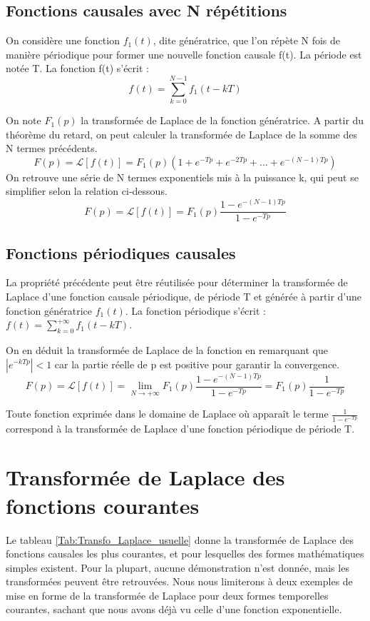 	\subsection{Fonctions causales avec N répétitions}
	On considère une fonction $f_{1}(t)$, dite génératrice, que l'on répète N fois de manière périodique pour former une nouvelle fonction causale f(t). La période est notée T. La fonction f(t) s'écrit :
	\begin{equation*}
	f(t)=\sum_{k=0}^{N-1}f_{1}(t-kT)
	\end{equation*}
	
	On note $F_{1}(p)$ la transformée de Laplace de la fonction génératrice. A partir du théorème du retard, on peut calculer la transformée de Laplace de la somme des N termes précédents.
	\begin{equation*}
	F(p)=\mathcal{L}[f(t)]=F_{1}(p)(1+e^{-Tp}+e^{-2Tp}+...+e^{-(N-1)Tp})
	\end{equation*}
	On retrouve une série de N termes exponentiels mis à la puissance k, qui peut se simplifier selon la relation ci-dessous. 
	\begin{equation}
	F(p)=\mathcal{L}[f(t)]=F_{1}(p)\frac{1-e^{-(N-1)Tp}}{1-e^{-Tp}}
	\end{equation}
	
	
	\subsection{Fonctions périodiques causales}
	La propriété précédente peut être réutilisée pour déterminer la transformée de Laplace d'une fonction causale périodique, de période T et générée à partir d'une fonction génératrice $f_{1}(t)$. La fonction périodique s'écrit : $f(t)=\sum_{k=0}^{+\infty}f_{1}(t-kT)$.
	
	On en déduit la transformée de Laplace de la fonction en remarquant que $|e^{-kTp}| < 1$ car la partie réelle de p est positive pour garantir la convergence.
	\begin{equation}
	F(p)=\mathcal{L}[f(t)]=\lim_{N \to +\infty}F_{1}(p)\frac{1-e^{-(N-1)Tp}}{1-e^{-Tp}}=F_{1}(p)\frac{1}{1-e^{-Tp}}
	\end{equation}
	
	Toute fonction exprimée dans le domaine de Laplace où apparaît le terme $\frac{1}{1-e^{-Tp}}$ correspond à la transformée de Laplace d'une fonction périodique de période T.
	
	\vspace{1\baselineskip}
		
	
	\section{Transformée de Laplace des fonctions courantes}
	Le tableau \ref{Tab:Transfo_Laplace_usuelle} donne la transformée de Laplace des fonctions causales les plus courantes, et pour lesquelles des formes mathématiques simples existent. Pour la plupart, aucune démonstration n'est donnée, mais les transformées peuvent être retrouvées. Nous nous limiterons à deux exemples de mise en forme de la transformée de Laplace pour deux formes temporelles courantes, sachant que nous avons déjà vu celle d'une fonction exponentielle.\\
	
